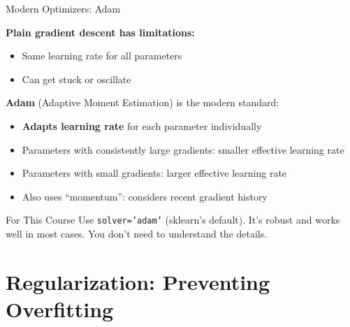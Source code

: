 \documentclass[10pt]{beamer}
\begin{document}
\begin{frame}{Modern Optimizers: Adam}

  \textbf{Plain gradient descent has limitations:}
  \begin{itemize}
    \item Same learning rate for all parameters
    \item Can get stuck or oscillate
  \end{itemize}

  \vspace{1em}
  \textbf{Adam} (Adaptive Moment Estimation) is the modern standard:
  \begin{itemize}
    \item \textbf{Adapts learning rate} for each parameter individually
    \item Parameters with consistently large gradients: smaller effective learning rate
    \item Parameters with small gradients: larger effective learning rate
    \item Also uses ``momentum'': considers recent gradient history
  \end{itemize}

  \vspace{1em}
  \begin{block}{For This Course}
    Use \texttt{solver='adam'} (sklearn's default). It's robust and works well in most cases. You don't need to understand the details.
  \end{block}
\end{frame}

\section{Regularization: Preventing Overfitting}
\end{document}
